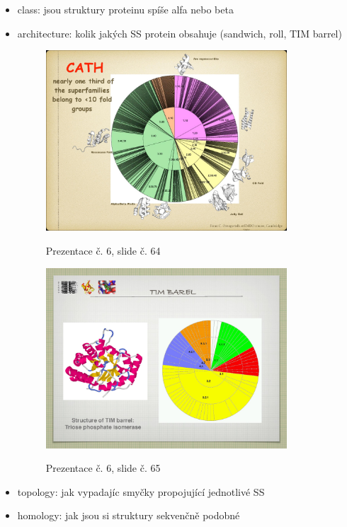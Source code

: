 \documentclass[DIV=8]{scrreprt}
\begin{document}
\begin{itemize}[nosep]
\begin{itemize}[nosep]
    \item class: jsou struktury proteinu spíše alfa nebo beta
    \item architecture: kolik jakých SS protein obsahuje (sandwich, roll, TIM barrel) \begin{figure}
    \caption{Prezentace č. 6, slide č. 64}
    \includegraphics[width=0.85\textwidth]{slides-6/slide-64.jpg}
    \centering
    \label{slides-6-slide-64}
\end{figure}
\begin{figure}
    \caption{Prezentace č. 6, slide č. 65}
    \includegraphics[width=0.85\textwidth]{slides-6/slide-65.jpg}
    \centering
    \label{slides-6-slide-65}
\end{figure}

    \item topology: jak vypadajíc smyčky propojující jednotlivé SS
    \item homology: jak jsou si struktury sekvenčně podobné
\end{itemize}

\end{itemize}
\end{document}
